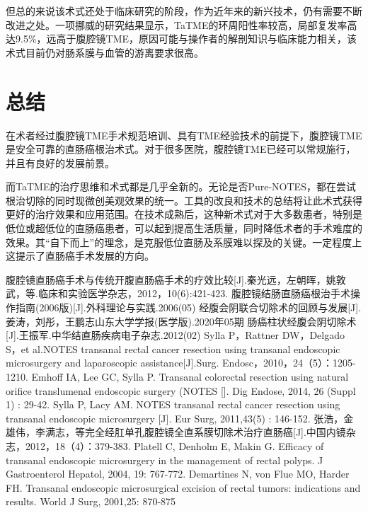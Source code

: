 \documentclass[a4paper,11pt,onecolumn,twoside]{article}
\begin{document}
\begin{multicols}{2}
    但总的来说该术式还处于临床研究的阶段，作为近年来的新兴技术，仍有需要不断改进之处。一项挪威的研究结果显示，TaTME的环周阳性率较高，局部复发率高达9.5\%，远高于腹腔镜TME，原因可能与操作者的解剖知识与临床能力相关，该术式目前仍对肠系膜与血管的游离要求很高\supercite{W7}。

    \section{总结}
    在术者经过腹腔镜TME手术规范培训、具有TME经验技术的前提下，腹腔镜TME是安全可靠的直肠癌根治术式。对于很多医院，腹腔镜TME已经可以常规施行，并且有良好的发展前景。

    而TaTME的治疗思维和术式都是几乎全新的。无论是否Pure-NOTES，都在尝试根治切除的同时现微创美观效果的统一。工具的改良和技术的总结将让此术式获得更好的治疗效果和应用范围。在技术成熟后，这种新术式对于大多数患者，特别是低位或超低位的直肠癌患者，可以起到提高生活质量，同时降低术者的手术难度的效果。其“自下而上”的理念，是克服低位直肠及系膜难以探及的关键。一定程度上这提示了直肠癌手术发展的方向。
    \small
    \begin{thebibliography}{14}
        \setlength{\parskip}{0pt}  %
        腹腔镜直肠癌手术与传统开腹直肠癌手术的疗效比较[J].秦光远，左朝晖，姚敦武，等.临床和实验医学杂志，2012，10(6):421-423.
        腹腔镜结肠直肠癌根治手术操作指南(2006版)[J].外科理论与实践.2006(05)
        经腹会阴联合切除术的回顾与发展[J].姜涛，刘彤，王鹏志山东大学学报(医学版).2020年05期
        肠癌柱状经腹会阴切除术[J].王振军.中华结直肠疾病电子杂志.2012(02)
        Sylla P，Rattner DW，Delgado S，et al.NOTES transanal rectal cancer resection using transanal endoscopic microsurgery and laparoscopic assistance[J].Surg. Endosc，2010，24（5）：1205-1210.
        Emhoff IA, Lee GC, Sylla P. Transanal colorectal resection using natural orifice translumenal endoscopic surgery
        (NOTES []. Dig Endose, 2014, 26 (Suppl 1) : 29-42.
        Sylla P, Lacy AM. NOTES transanal rectal cancer resection using transanal endoscopic microsurgery [J]. Eur Surg, 2011,43(5) : 146-152.
        张浩，金雄伟，李满志，等完全经肛单孔腹腔镜全直系膜切除术治疗直肠癌[J].中国内镜杂志，2012，18（4）：379-383.
        Platell C, Denholm E, Makin G. Efficacy of transanal endoscopic microsurgery in the management of rectal polyps. J Gastroenterol Hepatol, 2004, 19: 767-772.
        Demartines N, von Flue MO, Harder FH. Transanal endoscopic microsurgical excision of rectal tumors: indications and results. World J Surg, 2001,25: 870-875

\end{thebibliography}
\end{multicols}
\end{document}
